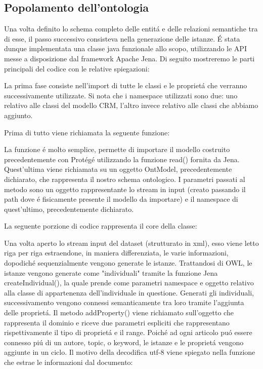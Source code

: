 \documentclass[11pt,a4paper]{article}
\begin{document}
\subsection{Popolamento dell'ontologia}
Una volta definito lo schema completo delle entit\'a e delle relazioni semantiche tra di esse, il passo successivo consisteva nella generazione delle istanze. \'E stata dunque implementata una classe java funzionale allo scopo, utilizzando le API messe a disposizione dal framework Apache Jena.
Di seguito mostreremo le parti principali del codice con le relative spiegazioni:

La prima fase consiste nell'import di tutte le classi e le propriet\'a che verranno successivamente utilizzate. Si nota che i namespace utilizzati sono due:
uno relativo alle classi del modello CRM, l'altro invece relativo alle classi che abbiamo aggiunto.



Prima di tutto viene richiamata la seguente funzione:



La funzione \'e molto semplice, permette di importare il modello costruito precedentemente con Prot\'eg\'e utilizzando la funzione read() fornita da Jena. Quest'ultima viene richiamata su un oggetto OntModel, precedentemente dichiarato, che rappresenta il nostro schema ontologico. I parametri passati al metodo sono un oggetto rappresentante lo stream in input (creato passando il path dove \'e fisicamente presente il modello da importare) e il namespace di quest'ultimo, precedentemente dichiarato.
\newline


La seguente porzione di codice rappresenta il core della classe:


Una volta aperto lo stream input del dataset (strutturato in xml), esso viene letto riga per riga estraendone, in maniera differenziata, le varie informazioni, dopodich\'e sequenzialmente vengono generate le istanze.
Trattandosi di OWL, le istanze vengono generate come "individuali" tramite la funzione Jena createIndividual(), la quale prende come parametri namespace e oggetto relativo alla classe di appartenenza dell'individuale in questione. 
Generati gli individuali, successivamento vengono connessi semanticamente tra loro tramite l'aggiunta delle propriet\'a.
Il metodo addProperty() viene richiamato sull'oggetto che rappresenta il dominio e riceve due parametri espliciti che rappresentano rispettivamente il tipo di propriet\'a e il range.
Poich\'e ad ogni articolo pu\'o essere connesso pi\'u di un autore, topic, o keyword, le istanze e le propriet\'a vengono aggiunte in un ciclo.
Il motivo della decodifica  utf-8 viene spiegato nella funzione che estrae le informazioni dal documento:
\end{document}
